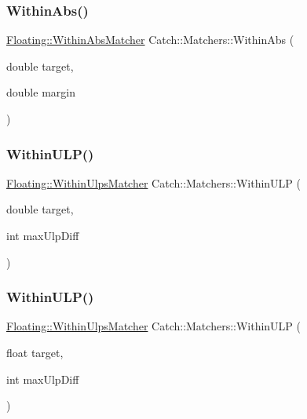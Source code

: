 \mbox{\label{namespace_catch_1_1_matchers_a4c9ea76d47d02de0cf2d354c87c26e95}} 
\subsubsection{\texorpdfstring{WithinAbs()}{WithinAbs()}}
{\footnotesize\ttfamily \mbox{\hyperlink{struct_catch_1_1_matchers_1_1_floating_1_1_within_abs_matcher}{Floating\+::\+Within\+Abs\+Matcher}} Catch\+::\+Matchers\+::\+Within\+Abs (\begin{DoxyParamCaption}\item[{double}]{target,  }\item[{double}]{margin }\end{DoxyParamCaption})}

\mbox{\label{namespace_catch_1_1_matchers_ae895591bd78a7d0ce4cdf3cf40d89ab5}} 
\subsubsection{\texorpdfstring{WithinULP()}{WithinULP()}\hspace{0.1cm}{\footnotesize\ttfamily [1/2]}}
{\footnotesize\ttfamily \mbox{\hyperlink{struct_catch_1_1_matchers_1_1_floating_1_1_within_ulps_matcher}{Floating\+::\+Within\+Ulps\+Matcher}} Catch\+::\+Matchers\+::\+Within\+U\+LP (\begin{DoxyParamCaption}\item[{double}]{target,  }\item[{int}]{max\+Ulp\+Diff }\end{DoxyParamCaption})}

\mbox{\label{namespace_catch_1_1_matchers_ab87ee77e5349fac450d1e631dee86496}} 
\subsubsection{\texorpdfstring{WithinULP()}{WithinULP()}\hspace{0.1cm}{\footnotesize\ttfamily [2/2]}}
{\footnotesize\ttfamily \mbox{\hyperlink{struct_catch_1_1_matchers_1_1_floating_1_1_within_ulps_matcher}{Floating\+::\+Within\+Ulps\+Matcher}} Catch\+::\+Matchers\+::\+Within\+U\+LP (\begin{DoxyParamCaption}\item[{float}]{target,  }\item[{int}]{max\+Ulp\+Diff }\end{DoxyParamCaption})}

